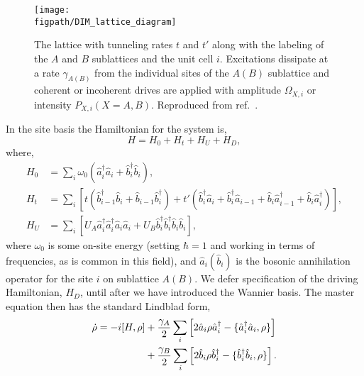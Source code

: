 \begin{figure}[ht!]
\centering
\texttt{[image: \\figpath/DIM\_lattice\_diagram]}
\caption{The lattice with tunneling rates \(t\) and \(t'\) along with the labeling of the \(A\) and \(B\) sublattices and the unit cell \(i\). Excitations dissipate at a rate \(\gamma_{A(B)}\) from the individual sites of the \(A (B)\) sublattice and coherent or incoherent drives are applied with amplitude \(\Omega_{X, i}\) or intensity \(P_{X, i}(X = A,B)\). Reproduced from ref.~\cite{Owen2017}.}
\label{fig:dim1-1}
\end{figure}

In the site basis the Hamiltonian for the system is,
\begin{equation}
	H = H_{0} + H_{t} + H_{U} + H_{D},
	\label{eq:dim1-1}
\end{equation}
where,
	\begin{align}
		H_{0} &= \sum_{i} \omega_{0}(\hat{a}_{i}^{\dagger}\hat{a}_{i} + \hat{b}_{i}^{\dagger}\hat{b}_{i}), \label{eq:dim1-2} \\
		H_{t} &= \sum_{i} \left[ t(\hat{b}_{i-1}^{\dagger}\hat{b}_{i} + \hat{b}_{i-1}\hat{b}_{i}^{\dagger}) + t'(\hat{b}_{i}^{\dagger}\hat{a}_{i} + \hat{b}_{i}^{\dagger}\hat{a}_{i-1} + \hat{b}_{i}\hat{a}_{i-1}^{\dagger} + \hat{b}_{i}\hat{a}_{i}^{\dagger})\right], \label{eq:dim1-3} \\
		H_{U} &= \sum_{i} \left[ U_{A}\hat{a}_{i}^{\dagger}\hat{a}_{i}^{\dagger}\hat{a}_{i}\hat{a}_{i} + U_{B}\hat{b}_{i}^{\dagger}\hat{b}_{i}^{\dagger}\hat{b}_{i}\hat{b}_{i}\right], \label{eq:dim1-4}
	\end{align}
	where \(\omega_{0}\) is some on-site energy (setting \(\hbar=1\) and working in terms of frequencies, as is common in this field), and \(\hat{a}_{i} (\hat{b}_{i})\) is the bosonic annihilation operator for the site \(i\) on sublattice \(A(B)\). We defer specification of the driving Hamiltonian, \(H_{D}\), until after we have introduced the Wannier basis. The master equation then has the standard Lindblad form,
	\begin{align}
		\dot{\rho} = -i[H, \rho] &+ \frac{\gamma_{A}}{2}\sum_{i}\left[ 2\hat{a}_{i}\rho\hat{a}_{i}^{\dagger} - \{\hat{a}_{i}^{\dagger}\hat{a}_{i}, \rho\} \right] \notag \\
		&+ \frac{\gamma_{B}}{2} \sum_{i} \left[ 2\hat{b}_{i}\rho\hat{b}_{i}^{\dagger} - \{\hat{b}_{i}^{\dagger}\hat{b}_{i}, \rho\} \right].
		\label{eq:dim1-5}
	\end{align}

